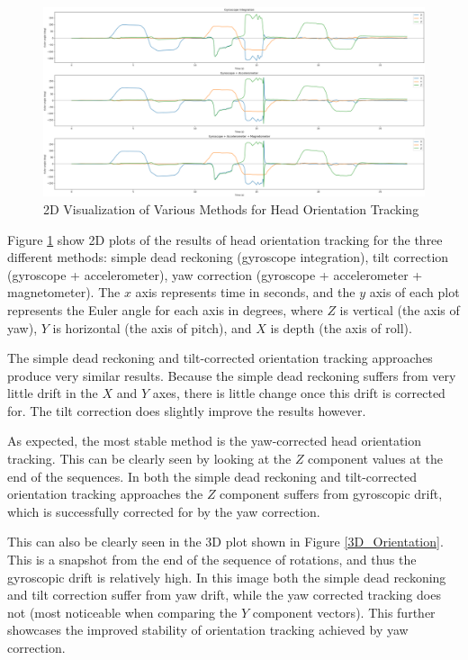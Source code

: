 \documentclass[11pt,a4paper]{article}
\begin{document}
	\begin{figure}[h!]
		\centering
		\includegraphics[width=1.0\linewidth]{figures/Orientation_Tracking_2D}
		\caption{2D Visualization of Various Methods for Head Orientation Tracking}
		\label{2D_Orientation}
	\end{figure}
	
	Figure \ref{2D_Orientation} show 2D plots of the results of head orientation tracking for the three different methods: simple dead reckoning (gyroscope integration), tilt correction (gyroscope + accelerometer), yaw correction (gyroscope + accelerometer + magnetometer). The $x$ axis represents time in seconds, and the $y$ axis of each plot represents the Euler angle for each axis in degrees, where $Z$ is vertical (the axis of yaw), $Y$ is horizontal (the axis of pitch), and $X$ is depth (the axis of roll).
	
	The simple dead reckoning and tilt-corrected orientation tracking approaches produce very similar results. Because the simple dead reckoning suffers from very little drift in the $X$ and $Y$ axes, there is little change once this drift is corrected for. The tilt correction does slightly improve the results however.
	
	As expected, the most stable method is the yaw-corrected head orientation tracking. This can be clearly seen by looking at the $Z$ component values at the end of the sequences. In both the simple dead reckoning and tilt-corrected orientation tracking approaches the $Z$ component suffers from gyroscopic drift, which is successfully corrected for by the yaw correction.
	
	This can also be clearly seen in the 3D plot shown in Figure \ref{3D_Orientation}. This is a snapshot from the end of the sequence of rotations, and thus the gyroscopic drift is relatively high. In this image both the simple dead reckoning and tilt correction suffer from yaw drift, while the yaw corrected tracking does not (most noticeable when comparing the $Y$ component vectors). This further showcases the improved stability of orientation tracking achieved by yaw correction.
	
\end{document}

